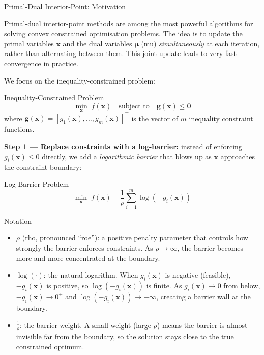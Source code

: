 \documentclass[aspectratio=169,10pt]{beamer}
\newcommand{\bx}{\mathbf{x}}
\newcommand{\bg}{\mathbf{g}}
\newcommand{\bmu}{\boldsymbol{\mu}}
\begin{document}
\begin{frame}[allowframebreaks]{Primal-Dual Interior-Point: Motivation}

  Primal-dual interior-point methods are among the most powerful algorithms
  for solving convex constrained optimisation problems.  The idea is to
  update the primal variables $\bx$ and the dual variables $\bmu$ (mu)
  \emph{simultaneously} at each iteration, rather than alternating between
  them.  This joint update leads to very fast convergence in practice.

  \medskip
  We focus on the inequality-constrained problem:
  \begin{block}{Inequality-Constrained Problem}
    \[
      \min_{\bx}\; f(\bx)
      \quad \text{subject to} \quad
      \bg(\bx) \le \mathbf{0}
    \]
    where $\bg(\bx) = [g_1(\bx), \ldots, g_m(\bx)]^\top$ is the vector of
    $m$ inequality constraint functions.
  \end{block}

  \textbf{Step 1 --- Replace constraints with a log-barrier:}  instead of
  enforcing $g_i(\bx) \le 0$ directly, we add a \emph{logarithmic barrier}
  that blows up as $\bx$ approaches the constraint boundary:
  \begin{block}{Log-Barrier Problem}
    \[
      \min_{\bx}\; f(\bx) - \frac{1}{\rho} \sum_{i=1}^{m} \log(-g_i(\bx))
    \]
  \end{block}

  \begin{block}{Notation}
    \begin{itemize}
      \item $\rho$ (rho, pronounced ``roe''): a positive penalty parameter
            that controls how strongly the barrier enforces constraints.
            As $\rho \to \infty$, the barrier becomes more and more
            concentrated at the boundary.
      \item $\log(\cdot)$: the natural logarithm.  When $g_i(\bx)$ is
            negative (feasible), $-g_i(\bx)$ is positive, so
            $\log(-g_i(\bx))$ is finite.  As $g_i(\bx) \to 0$ from below,
            $-g_i(\bx) \to 0^+$ and $\log(-g_i(\bx)) \to -\infty$,
            creating a barrier wall at the boundary.
      \item $\frac{1}{\rho}$: the barrier weight.  A small weight (large
            $\rho$) means the barrier is almost invisible far from the
            boundary, so the solution stays close to the true constrained
            optimum.
    \end{itemize}
  \end{block}


\end{frame}
\end{document}
